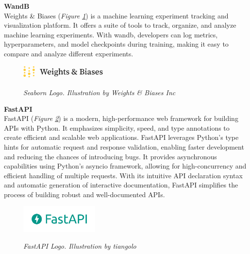 \vspace{0.5cm}
\textbf{WandB} \\

Weights \& Biases (\textit{Figure \ref{fig:wandb-logo}}) is a machine learning experiment tracking and visualization platform. It offers a suite of tools to track, organize, and analyze machine learning experiments. With wandb, developers can log metrics, hyperparameters, and model checkpoints during training, making it easy to compare and analyze different experiments.

\begin{figure}[H]
\centering
\includegraphics[width=0.4\textwidth]{imatges/studies_and_decisions/wandb-logo.png}
\caption[Seaborn Logo]{\textit{Seaborn Logo. Illustration by Weights \& Biases Inc}}
{\label{fig:wandb-logo}}
\end{figure}

\vspace{0.5cm}
\textbf{FastAPI} \\

FastAPI (\textit{Figure \ref{fig:fastapi-logo}}) is a modern, high-performance web framework for building APIs with Python. It emphasizes simplicity, speed, and type annotations to create efficient and scalable web applications. FastAPI leverages Python's type hints for automatic request and response validation, enabling faster development and reducing the chances of introducing bugs. It provides asynchronous capabilities using Python's asyncio framework, allowing for high-concurrency and efficient handling of multiple requests. With its intuitive API declaration syntax and automatic generation of interactive documentation, FastAPI simplifies the process of building robust and well-documented APIs.

\begin{figure}[H]
\centering
\begin{adjustbox}{trim=0cm 0.25cm, clip}
\includegraphics[width=0.35\textwidth]{imatges/studies_and_decisions/fastapi-logo.png}
\end{adjustbox}
\caption[FastAPI Logo]{\textit{FastAPI Logo. Illustration by tiangolo}}
{\label{fig:fastapi-logo}}
\end{figure}

